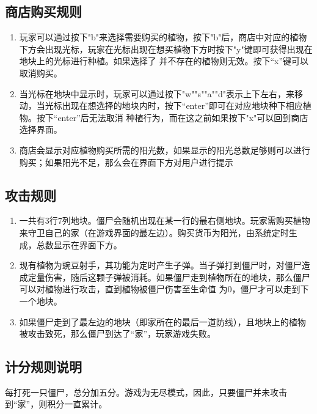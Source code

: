 \documentclass[12pt,a4paper,UTF8]{article}
\begin{document}
  \subsection{商店购买规则}
  \begin{enumerate}
      \item 玩家可以通过按下"b"来选择需要购买的植物，按下"b"后，商店中对应的植物下方会出现光标，玩家在光标出现在想买植物下方时按下"y"键即可获得出现在地块上的光标进行种植。如果选择了
      并不存在的植物则无效。按下“x”键可以取消购买。
      \item 当光标在地块中显示时，玩家可以通过按下"w""s""a""d"表示上下左右，来移动，当光标出现在想选择的地块内时，按下“enter”即可在对应地块种下相应植物。按下“enter”后无法取消
      种植行为，而在这之前如果按下"x"可以回到商店选择界面。
      \item 商店会显示对应植物购买所需的阳光数，如果显示的阳光总数足够则可以进行购买；如果阳光不足，那么会在界面下方对用户进行提示
  \end{enumerate}

  \subsection{攻击规则}
  \begin{enumerate}
    \item 一共有3行7列地块。僵尸会随机出现在某一行的最右侧地块。玩家需购买植物来守卫自己的家（在游戏界面的最左边）。购买货币为阳光，由系统定时生成，总数显示在界面下方。
    \item 现有植物为豌豆射手，其功能为定时产生子弹。当子弹打到僵尸时，对僵尸造成定量伤害，随后这颗子弹被消耗。如果僵尸走到植物所在的地块，那么僵尸可以对植物进行攻击，直到植物被僵尸伤害至生命值
    为0，僵尸才可以走到下一个地块。
    \item 如果僵尸走到了最左边的地块（即家所在的最后一道防线），且地块上的植物被攻击致死，那么僵尸到达了“家”，玩家游戏失败。
  \end{enumerate}

  \subsection{计分规则说明}
    每打死一只僵尸，总分加五分。游戏为无尽模式，因此，只要僵尸并未攻击到“家”，则积分一直累计。
\end{document}
